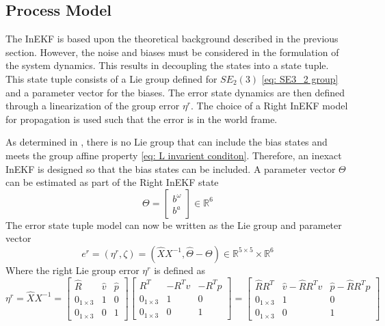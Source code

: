 \subsection{Process Model}
The InEKF is based upon the theoretical background described in the previous section. However, the noise and biases must be considered in the formulation of the system dynamics. This results in decoupling the states into a state tuple. This state tuple consists of a Lie group defined for $SE_2(3)$ \eqref{eq: SE3_2 group} and a parameter vector for the biases. The error state dynamics are then defined through a linearization of the group error $\eta^r$. The choice of a Right InEKF model for propagation is used such that the error is in the world frame. 

As determined in \cite{DBLP:journals/corr/BarrauB14}, there is no Lie group that can include the bias states and meets the group affine property \eqref{eq: L invarient conditon}. Therefore, an inexact InEKF is designed so that the bias states can be included. A parameter vector $\Theta$ can be estimated as part of the Right InEKF state \cite{Contact-Aided_Invarant_EKF}
\begin{equation}
    \Theta = \begin{bmatrix}
        b^{\omega} \\
        b^a
    \end{bmatrix}  \in \mathbb{R}^6
    \label{eq: Theta RInEKF}
\end{equation}
The error state tuple model can now be written as the Lie group and parameter vector \cite{Contact-Aided_Invarant_EKF}
\begin{equation}
    e^r = (\eta^r, \zeta) = (\hat{X} X^{-1}, \hat{\Theta} - \Theta) \in \mathbb{R}^{5 \times 5} \times \mathbb{R}^6
    \label{eq: e^r state tuple}
\end{equation}
Where the right Lie group error $\eta^r$ is defined as
\begin{equation}
    \eta^r = \hat{X} X^{-1} = 
        \begin{bmatrix}
            \hat{R} & \hat{v} & \hat{p}\\
            0_{1 \times 3} & 1 & 0\\
            0_{1 \times 3} & 0 & 1
        \end{bmatrix}
        \begin{bmatrix}
            R^T & -R^T v & -R^T p \\
            0_{1 \times 3} & 1 & 0\\
            0_{1 \times 3} & 0 & 1
        \end{bmatrix} =
        \begin{bmatrix}
            \hat{R} R^T & \hat{v} - \hat{R} R^T v & \hat{p} - \hat{R} R^T p\\
            0_{1 \times 3} & 1 & 0\\
            0_{1 \times 3} & 0 & 1
        \end{bmatrix}
    \label{eq: eta^r full}
\end{equation}
